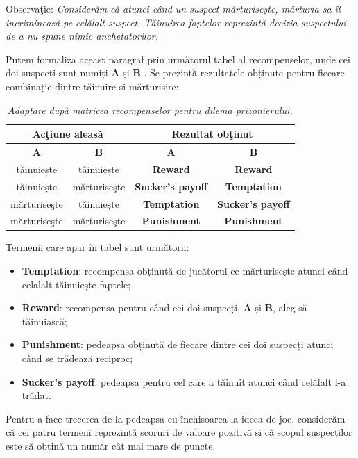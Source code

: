 Observaţie: \textit{Considerăm că atunci când un suspect mărturisește, mărturia sa îl incriminează pe celălalt suspect. Tăinuirea faptelor reprezintă decizia suspectului de a nu spune nimic anchetatorilor.}

Putem formaliza aceast paragraf prin următorul tabel al recompenselor, unde cei doi suspecți sunt numiți \textbf{A} și \textbf{B} \cite{plato_stanford}. Se prezintă rezultatele obținute pentru fiecare combinație dintre tăinuire și mărturisire:  

\begin{table}[H]
	\centering
	\def\arraystretch{1.75}
	\begin{tabular}{|c|c|c|c|}
		\hline
		\multicolumn{2}{|c|}{\textbf{Acţiune aleasă}} & \multicolumn{2}{c|}{\textbf{Rezultat obţinut}} \\ \hline
		\textbf{A} & \textbf{B} & \textbf{A} & \textbf{B} \\ \hline
		tăinuiește & tăinuiește & \textbf{Reward} & \textbf{Reward} \\ \hline
		tăinuiește & mărturiseşte & \textbf{Sucker's payoff} & \textbf{Temptation} \\ \hline
		mărturiseşte & tăinuiește & \textbf{Temptation} & \textbf{Sucker's payoff} \\ \hline
		mărturiseşte & mărturiseşte & \textbf{Punishment} & \textbf{Punishment} \\ \hline
	\end{tabular}
	\caption{\textit{Adaptare după matricea recompenselor pentru dilema prizonierului.}}
	\label{matricea_recompenselor}
\end{table}

Termenii care apar în tabel sunt următorii: 
 
\begin{itemize} 
	\item \textbf{Temptation}: recompensa obținută de jucătorul ce mărturisește atunci când celalalt tăinuiește faptele;
	\item \textbf{Reward}: recompensa pentru când cei doi suspecți, \textbf{A} și \textbf{B}, aleg să tăinuiască; 
	\item \textbf{Punishment}: pedeapsa obținută de fiecare dintre cei doi suspecți atunci când se trădează reciproc; 
	\item \textbf{Sucker's payoff}: pedeapsa pentru cel care a tăinuit atunci când celălalt l-a trădat. 
\end{itemize} 
 
Pentru a face trecerea de la pedeapsa cu închisoarea la ideea de joc, considerăm că cei patru termeni reprezintă scoruri de valoare pozitivă și că scopul suspecților este să obțină un număr cât mai mare de puncte. 

